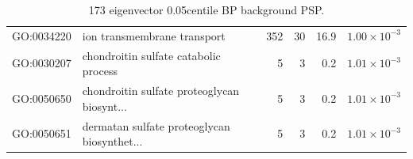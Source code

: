 \begin{table}[ht]
\begin{tabular}{llrrrr}
  GO:0034220 & ion transmembrane transport & 352 & 30 & 16.9 & $1.00 \times 10^{-3}$ \\ 
  GO:0030207 & chondroitin sulfate catabolic process & 5 & 3 & 0.2 & $1.01 \times 10^{-3}$ \\ 
  GO:0050650 & chondroitin sulfate proteoglycan biosynt... & 5 & 3 & 0.2 & $1.01 \times 10^{-3}$ \\ 
  GO:0050651 & dermatan sulfate proteoglycan biosynthet... & 5 & 3 & 0.2 & $1.01 \times 10^{-3}$ \\ 
   \hline
\end{tabular}
\caption{173 eigenvector 0.05centile  BP background PSP.} 
\label{tab:173 eigenvector 0.05centile  BP background PSP.}
\end{table}

